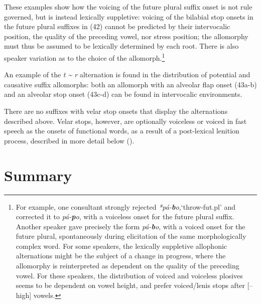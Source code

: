 These examples show how the voicing of the future plural suffix onset is not rule governed, but is instead lexically suppletive: voicing of the bilabial stop onsets in the future plural suffixes in (42) cannot be predicted by their intervocalic position, the quality of the preceding vowel, nor stress position; the allomorphy must thus be assumed to be lexically determined by each root. There is also speaker variation as to the choice of the allomorph.\footnote{For example, one consultant strongly rejected \textit{*pá-}\textbf{\textit{b}}\textit{o,}‘throw-fut.pl’ and corrected it to \textit{pá-}\textbf{\textit{p}}\textit{o}, with a voiceless onset for the future plural suffix. Another speaker gave precisely the form \textit{pá-}\textbf{\textit{b}}\textit{o}, with a voiced onset for the future plural, spontaneously during elicitation of the same morphologically complex word. For some speakers, the lexically suppletive allophonic alternations might be the subject of a change in progress, where the allomorphy is reinterpreted as dependent on the quality of the preceding vowel. For these speakers, the distribution of voiced and voiceless plosives seems to be dependent on vowel height, and prefer voiced/lenis stops after [–high] vowels.}

An example of the \textit{t {\textasciitilde} r} alternation is found in the distribution of potential and causative suffix allomorphs: both an allomorph with an alveolar flap onset (43a-b) and an alveolar stop onset (43c-d) can be found in intervocalic environments.






There are no suffixes with velar stop onsets that display the alternations described above. Velar stops, however, are optionally voiceless or voiced in fast speech as the onsets of functional words, as a result of a post-lexical lenition process, described in more detail below ().

\section{Summary}
\label{sec: summary}

